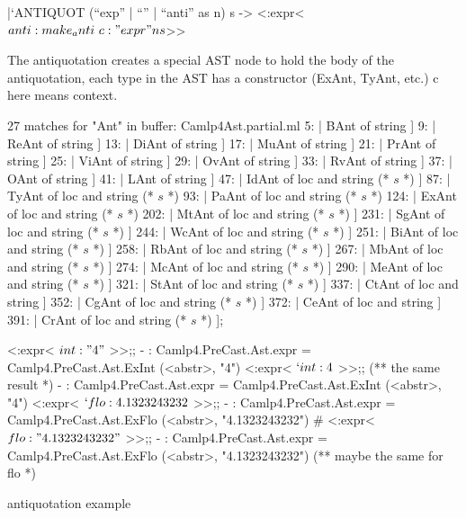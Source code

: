 \begin{enumerate}
\begin{bluetext}
  |`ANTIQUOT (``exp'' | ``'' | ``anti'' as n) s ->
  <:expr< $anti:make_anti ~c:"expr" n s $>>
\end{bluetext}

The antiquotation creates a special AST node to hold the body of the
antiquotation, each type in the AST has a constructor (ExAnt, TyAnt,
etc.) c here means context.

\begin{bluetext}
  27 matches for "Ant" in buffer: Camlp4Ast.partial.ml
      5:    | BAnt of string ]
      9:    | ReAnt of string ]
     13:    | DiAnt of string ]
     17:    | MuAnt of string ]
     21:    | PrAnt of string ]
     25:    | ViAnt of string ]
     29:    | OvAnt of string ]
     33:    | RvAnt of string ]
     37:    | OAnt of string ]
     41:    | LAnt of string ]
     47:    | IdAnt of loc and string (* $s$ *) ]
     87:    | TyAnt of loc and string (* $s$ *)
     93:    | PaAnt of loc and string (* $s$ *)
    124:    | ExAnt of loc and string (* $s$ *)
    202:    | MtAnt of loc and string (* $s$ *) ]
    231:    | SgAnt of loc and string (* $s$ *) ]
    244:    | WcAnt of loc and string (* $s$ *) ]
    251:    | BiAnt of loc and string (* $s$ *) ]
    258:    | RbAnt of loc and string (* $s$ *) ]
    267:    | MbAnt of loc and string (* $s$ *) ]
    274:    | McAnt of loc and string (* $s$ *) ]
    290:    | MeAnt of loc and string (* $s$ *) ]
    321:    | StAnt of loc and string (* $s$ *) ]
    337:    | CtAnt of loc and string ]
    352:    | CgAnt of loc and string (* $s$ *) ]
    372:    | CeAnt of loc and string ]
    391:    | CrAnt of loc and string (* $s$ *) ];
\end{bluetext}

\begin{alternate}
<:expr< $int: "4"$ >>;;
- : Camlp4.PreCast.Ast.expr = Camlp4.PreCast.Ast.ExInt (<abstr>, "4")
<:expr< $`int: 4$ >>;; (** the same result *)
- : Camlp4.PreCast.Ast.expr = Camlp4.PreCast.Ast.ExInt (<abstr>, "4")
<:expr< $`flo:4.1323243232$ >>;;
- : Camlp4.PreCast.Ast.expr = Camlp4.PreCast.Ast.ExFlo (<abstr>, "4.1323243232")
# <:expr< $flo:"4.1323243232"$ >>;;
- : Camlp4.PreCast.Ast.expr = Camlp4.PreCast.Ast.ExFlo (<abstr>, "4.1323243232")
(** maybe the same for flo *)
\end{alternate}

antiquotation example 


\end{enumerate}
